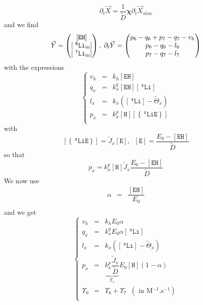 \documentclass[aps,onecolumn,12pt]{revtex4}
\newcommand{\mychem}[1]{\mathtt{#1}}
\newcommand{\myconc}[1]{\left\lbrack{#1}\right\rbrack}
\newcommand{\spLi}[1]{{~^{\mychem{#1}}\mychem{Li}}}
\newcommand{\Li}[1]{\myconc{\spLi{#1}}}
\newcommand{\spEout}{\mychem{E}}
\newcommand{\Eout}{\myconc{\spEout}}
\newcommand{\spLiE}[1]{\left\lbrace\spLi{#1}\spEout\right\rbrace}
\newcommand{\LiE}[1]{\myconc{\spLiE{#1}}}
\newcommand{\spLiIn}[1]{{\spLi{#1}}_{\mathrm{in}}}
\newcommand{\LiIn}[1]{\myconc{\spLiIn{#1}}}
\newcommand{\spEHin}{\mychem{EH}}
\newcommand{\EHin}{\myconc{\spEHin}}
\newcommand{\spproton}{\mychem{H}}
\newcommand{\proton}{\myconc{\spproton}}
\newcommand{\mymat}[1]{{\bm{#1}}}
\begin{document}
\begin{equation}
	\partial_t\vec{X} = \dfrac{1}{\tilde{D}}
	\mymat{\chi} \partial_t\vec{X}_{slow}
\end{equation}
and we find
\begin{equation}
	\vec{Y} = \begin{pmatrix} \EHin \cr \LiIn{6} \cr \LiIn{7} \end{pmatrix}
	,\;\partial_t \vec{Y} = 
	\begin{pmatrix}
	p_6-q_6+p_7-q_7-v_h\\
	p_6-q_6-l_6\\
	p_7-q_7-l_7
	\end{pmatrix}
\end{equation}
with the expressions
\begin{equation}
\left\lbrace
	\begin{array}{rcl}
	v_h & = & k_h \EHin \\
	q_x & = & k_x^q \EHin \Li{x}  \\
	l_x & = & k_x  \left(\Li{x}- \tilde{\Theta}_x\right)\\
	p_x & = & k_x^p \proton \LiE{x}\\
	\end{array}
\right.
\end{equation}
with
\begin{equation}
	\LiE{x} = \tilde{J}_x \Eout,\;\;\Eout=\dfrac{E_0-\EHin}{\tilde{D}}
\end{equation}
so that
\begin{equation}
	p_x = k_x^p \proton  \tilde{J}_x \dfrac{E_0-\EHin}{\tilde{D}}
\end{equation}
We now use
\begin{equation}
	\begin{array}{rcl}
	\alpha    & = &\dfrac{\EHin}{E_0}\\
	\end{array}
\end{equation}
and we get
\begin{equation}
	\left\lbrace
	\begin{array}{rcl}
	v_h & = & k_h E_0 \alpha \\
	q_x & = & k_x^q E_0 \alpha \Li{x}  \\
	l_x & = & k_x \left(\Li{x} - \tilde{\Theta}_x\right)\\
	p_x & = & \underbrace{k_x^p  \dfrac{\tilde{J}_x}{\tilde{D}}}_{\Upsilon_x} E_0 \proton(1-\alpha) \\
	\Upsilon_0 & = & \Upsilon_6 + \Upsilon_7 \;\;\left(\text{ in M$^{-1}$.s$^{-1}$}\right) \\
	\end{array}
\right.
\end{equation}
\end{document}

